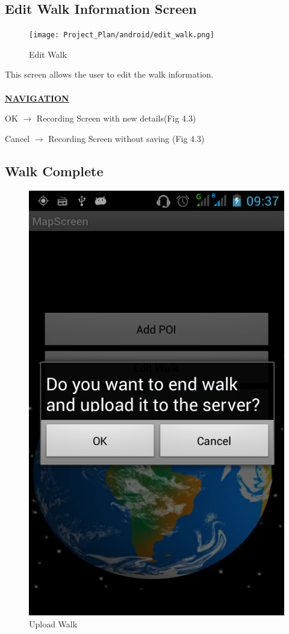\documentclass[12pt]{article}
\begin{document}
\subsection{Edit Walk Information Screen}
\begin{figure}[htp]
\centering
\texttt{[image: Project\_Plan/android/edit\_walk.png]}
\caption{Edit Walk}
\label{Edit Walk}
\end{figure}
\par{This screen allows the user to edit the walk information. \\ \\}
\textbf{\uline{NAVIGATION}}
\par{OK $\rightarrow$ Recording Screen with new details(Fig 4.3)}
\par{Cancel $\rightarrow$ Recording Screen without saving (Fig 4.3)}
\clearpage
\subsection{Walk Complete}
\begin{figure}[htp]
\centering
\includegraphics[scale=0.40]{Project_Plan/android/upload_walk.png}
\caption{Upload Walk}
\label{Upload Walk}
\end{figure}
\end{document}
